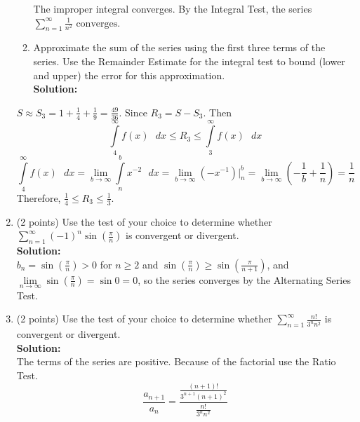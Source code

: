 \documentclass[paper=a4, fontsize=11pt]{scrartcl} %
\numberwithin{equation}{section} %
\numberwithin{figure}{section} %
\numberwithin{table}{section} %
\begin{document}
\begin{enumerate}
\begin{enumerate}
The improper integral converges. By the Integral Test, the series $\sum\limits_{n=1}^\infty \frac{1}{n^2}$ $\boxed{ \text{converges}}$.
\vspace{.25in}
\newpage
\item Approximate the sum of the series using the first three terms of the series. Use the Remainder Estimate for the integral test to bound (lower and upper) the error for this approximation.
\\
\noindent\textbf{Solution:}\\
\end{enumerate}
$S \approx S_3 = 1 + \frac{1}{4} + \frac{1}{9} = \frac{49}{36}$.  Since $R_3=S-S_3$.  Then
\begin{equation*}
\int\limits_4^\infty f(x) \text{ } dx \le R_3 \le \int\limits_3^\infty f(x) \text{ } dx
\end{equation*}
\begin{equation*}
\int\limits_4^\infty f(x) \text{ } dx = \lim_{b \rightarrow \infty} \int\limits_n^b x^{-2} \text{ } dx = \lim_{b \rightarrow \infty} \left( -x^{-1} \right)|^b_n = \lim_{b \rightarrow \infty} \left( -\frac{1}{b}+\frac{1}{n} \right) = \frac{1}{n}
\end{equation*}
Therefore, $\boxed{\frac{1}{4} \le R_3 \le \frac{1}{3}}$.

\vspace{1.5in}

\item (2 points) Use the test of your choice to determine whether 
$\sum\limits_{n=1}^\infty (-1)^n \sin \left( \frac{\pi}{n} \right)$ is convergent or divergent.\\
\noindent\textbf{Solution:}\\
$b_n=\sin \left( \frac{\pi}{n} \right)>0$ for $n \ge 2$ and $\sin \left( \frac{\pi}{n} \right) \ge \sin \left( \frac{\pi}{n+1} \right)$, and $\lim\limits_{n \rightarrow \infty} \sin \left( \frac{\pi}{n} \right) = \sin 0 = 0$, so the series converges by the Alternating Series Test.

\newpage

\item (2 points) Use the test of your choice to determine whether 
$\sum\limits_{n=1}^\infty \frac{n!}{3^n n^2}$ is convergent or divergent.\\
\noindent\textbf{Solution:}\\
The terms of the series are positive.  Because of the factorial use the Ratio Test.
\begin{equation*}
\frac{a_{n+1}}{a_n}=\frac{\frac{(n+1)!}{3^{n+1}(n+1)^2}}{\frac{n!}{3^n n^2}}
\end{equation*}


\end{enumerate}
\end{document}
